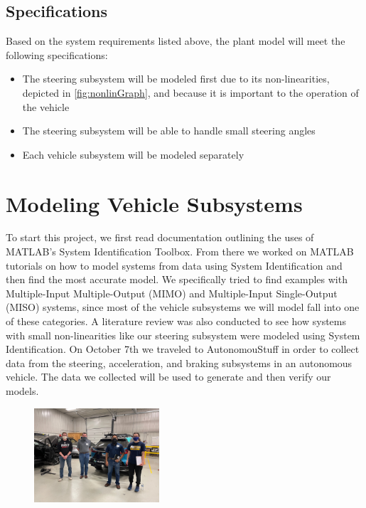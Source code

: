 \documentclass[letterpaper,12pt]{article}   %
\begin{document}
 \subsection{Specifications}
 Based on the system requirements listed above, the plant model will meet the following specifications:
 \begin{itemize}
    \item The steering subsystem will be modeled first due to its non-linearities, depicted in \autoref{fig:nonlinGraph}, and because it is important to the operation of the vehicle 
    \item The steering subsystem will be able to handle small steering angles
    \item Each vehicle subsystem will be modeled separately
 \end{itemize}

\section{Modeling Vehicle Subsystems}
To start this project, we first read documentation outlining the uses of
MATLAB's System Identification Toolbox. From there we worked on MATLAB tutorials
on how to model systems from data using System Identification and then find the
most accurate model. We specifically tried to find examples with Multiple-Input
Multiple-Output (MIMO) and Multiple-Input Single-Output (MISO) systems, since
most of the vehicle subsystems we will model fall into one of these categories.
A literature review was also conducted to see how systems with small
non-linearities like our steering subsystem were modeled using System
Identification. On October 7th we traveled to AutonomouStuff in order to collect
data from the steering, acceleration, and braking subsystems in an autonomous
vehicle. The data we collected will be used to generate and then verify our
models.
\begin{figure}[h]
	\centering
		{\includegraphics[height=3.5cm, width=0.4\linewidth]{figs/img/picturesVisitToAStuff/visitors1-20211007}}
\end{figure}
\end{document}
